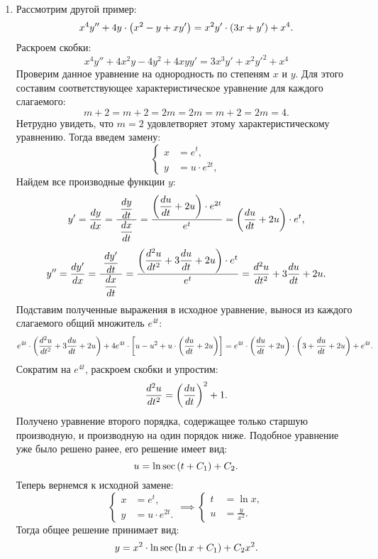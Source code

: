\begin{enumerate}
			\item Рассмотрим другой пример:
				\[ x^4 y'' + 4y \cdot \left( x^2 - y + xy' \right) = x^2y' \cdot \left( 3x + y' \right) + x^4. \]
				Раскроем скобки:
				\[ x^4 y'' + 4x^2 y - 4y^2 + 4xyy' = 3x^3y' + x^2 y'^2 + x^4 \]
				Проверим данное уравнение на однородность по степеням $x$ и $y$. Для этого составим соответствующее характеристическое уравнение для каждого слагаемого:
				\[ m + 2 = m + 2 = 2m = 2m = m + 2 = 2m = 4. \]
				Нетрудно увидеть, что $m = 2$ удовлетворяет этому характеристическому уравнению. Тогда введем замену:
				\[ \left\lbrace \begin{split} 
					x &= e^{t}, \\
					y &= u \cdot e^{2t},
				\end{split} \right. \]
				Найдем все производные функции $y$:
				\[ y' = \dfrac{d y}{d x} = \frac{~\dfrac{d y}{d t}~}{~\dfrac{d x}{d t}~} = \frac{\left( \dfrac{d u}{d t} + 2u \right) \cdot e^{2t}}{e^{t}} = \left( \dfrac{d u}{d t} + 2u \right) \cdot e^{t}, \]
				\[ y'' = \dfrac{d y'}{d x} = \frac{~\dfrac{d y'}{d t}~}{~\dfrac{d x}{d t}~} = \frac{\left( \dfrac{d^{2} u}{d t^{2}} + 3\dfrac{d u}{d t} + 2u \right) \cdot e^{t}}{e^{t}} = \dfrac{d^{2} u}{d t^{2}} + 3\dfrac{d u}{d t} + 2u. \]
				Подставим полученные выражения в исходное уравнение, вынося из каждого слагаемого общий множитель $e^{4t}$:
				\[ e^{4t} \cdot \left( \dfrac{d^{2} u}{d t^{2}} + 3\dfrac{d u}{d t} + 2u \right) + 4e^{4t} \cdot \left[ u - u^2 + u \cdot \left( \dfrac{d u}{d t} + 2u \right) \right] = e^{4t} \cdot \left( \dfrac{d u}{d t} + 2u \right) \cdot \left( 3 + \dfrac{d u}{d t} + 2u \right) + e^{4t}. \]
				Сократим на $e^{4t}$, раскроем скобки и упростим:
				\[ \dfrac{d^{2} u}{d t^{2}} = \left( \dfrac{d u}{d t} \right)^2 + 1. \]
				Получено уравнение второго порядка, содержащее только старшую производную, и производную на один порядок ниже. Подобное уравнение уже было решено ранее, его решение имеет вид:
				\[ u = \ln{\sec \left( t + C_1 \right) } + C_2. \]
				Теперь вернемся к исходной замене:
				\[ \left\lbrace \begin{split} 
					x &= e^{t}, \\
					y &= u \cdot e^{2t}.
				\end{split} \right. \implies \left\lbrace \begin{split}
					t &= \ln{x}, \\
					u &= \frac{y}{x^2}.
				\end{split} \right. \]
				Тогда общее решение принимает вид:
				\[ y = x^2 \cdot \ln{\sec{ \left( \ln{x} + C_1 \right) }} + C_2 x^2. \]
		
		\end{enumerate}

	\pagebreak